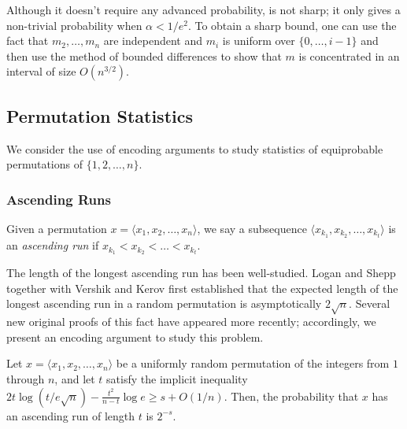 \documentclass{patmorin}
\begin{document}
\begin{rem}
  Although it doesn't require any advanced probability,
   is not sharp; it only gives a non-trivial
  probability when $\alpha < 1/e^2$.  To obtain a sharp bound, one can
  use the fact that $m_2,\ldots,m_n$ are independent and $m_i$ is uniform
  over $\{0,\ldots,i-1\}$ and then use the method of bounded differences
  \cite{mcdiarmid:on} to show that $m$ is concentrated in an interval
  of size $O(n^{3/2})$.
\end{rem}

\subsection{Permutation Statistics}

We consider the use of encoding arguments to study statistics of
equiprobable permutations of $\{1, 2, \ldots, n\}$.

\subsubsection{Ascending Runs}

Given a permutation $x = \langle x_1, x_2, \ldots, x_n \rangle$, we
say a subsequence $\langle x_{k_1}, x_{k_2}, \ldots, x_{k_t} \rangle$
is an {\em ascending run} if $x_{k_1} < x_{k_2} < \ldots < x_{k_t}$.

The length of the longest ascending run has been well-studied. Logan
and Shepp \cite{logan.shepp:runs} together with Vershik and Kerov
\cite{vershik.kerov:runs} first established that the expected length
of the longest ascending run in a random permutation is asymptotically
$2 \sqrt{n}$. Several new original proofs of this fact have appeared
more recently; accordingly, we present an encoding argument to study
this problem.

\begin{thm}
  Let $x = \langle x_1, x_2, \ldots, x_n \rangle$ be a uniformly
  random permutation of the integers from $1$ through $n$, and let $t$
  satisfy the implicit inequality
  $2t\log(t/e\sqrt{n}) - \frac{t^2}{n - t}\log e \geq s + O(1/n)$.
  Then, the probability that $x$ has an ascending run of length $t$ is
  $2^{-s}$.
\end{thm}
\end{document}
